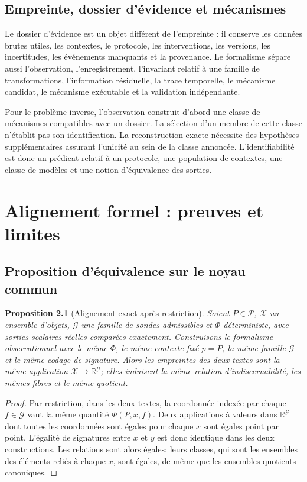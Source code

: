 \documentclass[11pt,a4paper,oneside]{report}
\newtheorem{proposition}{Proposition}[chapter]
\newcommand{\R}{\mathbb R}
\newcommand{\X}{\mathcal X}
\newcommand{\Pcal}{\mathcal P}
\newcommand{\Gcal}{\mathcal G}
\begin{document}
\section{Empreinte, dossier d'évidence et mécanismes}
Le dossier d'évidence est un objet différent de l'empreinte : il conserve les données brutes utiles, les contextes, le protocole, les interventions, les versions, les incertitudes, les événements manquants et la provenance. Le formalisme sépare aussi l'observation, l'enregistrement, l'invariant relatif à une famille de transformations, l'information résiduelle, la trace temporelle, le mécanisme candidat, le mécanisme exécutable et la validation indépendante.

Pour le problème inverse, l'observation construit d'abord une classe de mécanismes compatibles avec un dossier. La sélection d'un membre de cette classe n'établit pas son identification. La reconstruction exacte nécessite des hypothèses supplémentaires assurant l'unicité au sein de la classe annoncée. L'identifiabilité est donc un prédicat relatif à un protocole, une population de contextes, une classe de modèles et une notion d'équivalence des sorties.

\chapter{Alignement formel : preuves et limites}
\section{Proposition d'équivalence sur le noyau commun}
\begin{proposition}[Alignement exact après restriction]
Soient \(P\in\Pcal\), \(\X\) un ensemble d'objets, \(\Gcal\) une famille de sondes admissibles et \(\Phi\) déterministe, avec sorties scalaires réelles comparées exactement. Construisons le formalisme observationnel avec le même \(\Phi\), le même contexte fixé \(p=P\), la même famille \(\Gcal\) et le même codage de signature. Alors les empreintes des deux textes sont la même application \(\X\to\R^{\Gcal}\); elles induisent la même relation d'indiscernabilité, les mêmes fibres et le même quotient.
\end{proposition}
\begin{proof}
Par restriction, dans les deux textes, la coordonnée indexée par chaque \(f\in\Gcal\) vaut la même quantité \(\Phi(P,x,f)\). Deux applications à valeurs dans \(\R^{\Gcal}\) dont toutes les coordonnées sont égales pour chaque \(x\) sont égales point par point. L'égalité de signatures entre \(x\) et \(y\) est donc identique dans les deux constructions. Les relations sont alors égales; leurs classes, qui sont les ensembles des éléments reliés à chaque \(x\), sont égales, de même que les ensembles quotients canoniques.\end{proof}
\end{document}
